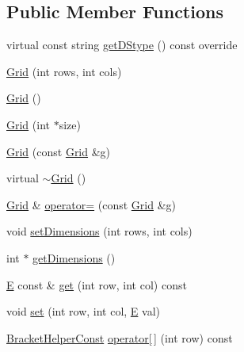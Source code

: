 \subsection*{Public Member Functions}
\begin{DoxyCompactItemize}
\item 
virtual const string \mbox{\hyperlink{classbridges_1_1_grid_ab701d081de4f7ffafb15966758dd5446}{get\+D\+Stype}} () const override
\item 
\mbox{\hyperlink{classbridges_1_1_grid_af8bb9244c4c713f2325af6d4754ad1e9}{Grid}} (int rows, int cols)
\item 
\mbox{\hyperlink{classbridges_1_1_grid_a711e05a933c2a11c9e2775c74e6cf80d}{Grid}} ()
\item 
\mbox{\hyperlink{classbridges_1_1_grid_ad5c6c5e87eb40446ac794c5479937f87}{Grid}} (int $\ast$size)
\item 
\mbox{\hyperlink{classbridges_1_1_grid_aff3e633c9454fbc66cab5ffe0c6812db}{Grid}} (const \mbox{\hyperlink{classbridges_1_1_grid}{Grid}} \&\mbox{\hyperlink{namespacebridges_acfb0a4f7877d8f63de3e6862004c50edab2f5ff47436671b6e533d8dc3614845d}{g}})
\item 
virtual \mbox{\hyperlink{classbridges_1_1_grid_a46cc94397ea38211349b10e3629b2590}{$\sim$\+Grid}} ()
\item 
\mbox{\hyperlink{classbridges_1_1_grid}{Grid}} \& \mbox{\hyperlink{classbridges_1_1_grid_ad5b960f574d1f5bddfffbfd8ce2d870b}{operator=}} (const \mbox{\hyperlink{classbridges_1_1_grid}{Grid}} \&\mbox{\hyperlink{namespacebridges_acfb0a4f7877d8f63de3e6862004c50edab2f5ff47436671b6e533d8dc3614845d}{g}})
\item 
void \mbox{\hyperlink{classbridges_1_1_grid_a8e5e4d92097f9d1481a14219eb5cc5a8}{set\+Dimensions}} (int rows, int cols)
\item 
int $\ast$ \mbox{\hyperlink{classbridges_1_1_grid_ad21e4fc94483ef822fda9b74a52b9f48}{get\+Dimensions}} ()
\item 
\mbox{\hyperlink{namespacebridges_acfb0a4f7877d8f63de3e6862004c50eda3a3ea00cfc35332cedf6e5e9a32e94da}{E}} const  \& \mbox{\hyperlink{classbridges_1_1_grid_a6d6a2db1f64de5cbe4786f2f923cd4ba}{get}} (int row, int col) const
\item 
void \mbox{\hyperlink{classbridges_1_1_grid_acd750e5886349488257aba85f0b06f6f}{set}} (int row, int col, \mbox{\hyperlink{namespacebridges_acfb0a4f7877d8f63de3e6862004c50eda3a3ea00cfc35332cedf6e5e9a32e94da}{E}} val)
\item 
\mbox{\hyperlink{classbridges_1_1_grid_1_1_bracket_helper_const}{Bracket\+Helper\+Const}} \mbox{\hyperlink{classbridges_1_1_grid_ac49b7eb0ffe27d665b56655e2ef6fe7d}{operator\mbox{[}$\,$\mbox{]}}} (int row) const

\end{DoxyCompactItemize}
